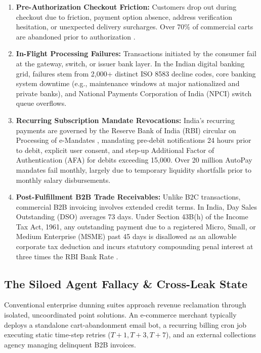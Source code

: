 \documentclass[10pt, twocolumn, a4paper]{article}
\newcommand{\INR}{\text{INR~}}
\begin{document}
\begin{enumerate}[leftmargin=*]
  \item \textbf{Pre-Authorization Checkout Friction:} Customers drop out during checkout due to friction, payment option absence, address verification hesitation, or unexpected delivery surcharges. Over 70\% of commercial carts are abandoned prior to authorization \citep{gocardless2023}.
  
  \item \textbf{In-Flight Processing Failures:} Transactions initiated by the consumer fail at the gateway, switch, or issuer bank layer. In the Indian digital banking grid, failures stem from 2,000+ distinct ISO 8583 decline codes, core banking system downtime (e.g., maintenance windows at major nationalized and private banks), and National Payments Corporation of India (NPCI) switch queue overflows.
  
  \item \textbf{Recurring Subscription Mandate Revocations:} India's recurring payments are governed by the Reserve Bank of India (RBI) circular on Processing of e-Mandates \citep{rbi2021mandates}, mandating pre-debit notifications 24 hours prior to debit, explicit user consent, and step-up Additional Factor of Authentication (AFA) for debits exceeding \INR 15,000. Over 20 million AutoPay mandates fail monthly, largely due to temporary liquidity shortfalls prior to monthly salary disbursements.
  
  \item \textbf{Post-Fulfillment B2B Trade Receivables:} Unlike B2C transactions, commercial B2B invoicing involves extended credit terms. In India, Day Sales Outstanding (DSO) averages 73 days. Under Section 43B(h) of the Income Tax Act, 1961, any outstanding payment due to a registered Micro, Small, or Medium Enterprise (MSME) past 45 days is disallowed as an allowable corporate tax deduction and incurs statutory compounding penal interest at three times the RBI Bank Rate \citep{msmed2006}.
\end{enumerate}

\subsection{The Siloed Agent Fallacy \& Cross-Leak State}
Conventional enterprise dunning suites approach revenue reclamation through isolated, uncoordinated point solutions. An e-commerce merchant typically deploys a standalone cart-abandonment email bot, a recurring billing cron job executing static time-step retries ($T+1, T+3, T+7$), and an external collections agency managing delinquent B2B invoices. 
\end{document}
